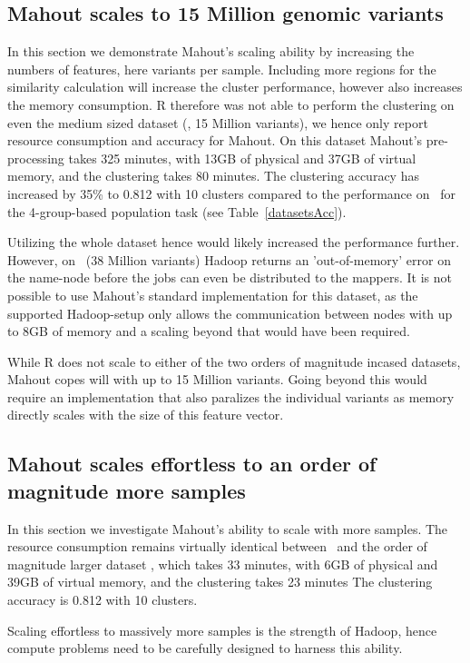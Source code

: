 \documentclass{bioinfo}
\begin{document}
\subsection*{Mahout scales to 15 Million genomic variants}
In this section we demonstrate Mahout's scaling ability by increasing the numbers of features, here variants per sample. 
Including more regions for the similarity calculation will increase the cluster performance, however also increases the memory consumption. 
R therefore was not able to perform the clustering on even the medium sized dataset (\SixReal , 15 Million variants), we hence only report resource consumption and accuracy for Mahout.
On this dataset Mahout's pre-processing takes 325 minutes, with 13GB of physical and 37GB of virtual memory, and the clustering takes 80 minutes.
The clustering accuracy has increased by 35\% to 0.812 with 10 clusters compared to the performance on \OneReal\ for the 4-group-based population task (see Table~\ref{datasetsAcc}).

Utilizing the whole dataset hence would likely increased the performance further. However, on \FullReal\ (38 Million variants) Hadoop returns an 'out-of-memory' error on the name-node before the jobs can even be distributed to the mappers. 
It is not possible to use Mahout's standard implementation for this dataset, as the supported Hadoop-setup only allows the communication between nodes with up to 8GB of memory and a scaling beyond that would have been required.

While R does not scale to either of the two orders of magnitude incased datasets, Mahout copes will with up to 15 Million variants. Going beyond this would require an implementation that also paralizes the individual variants as memory directly scales with the size of this feature vector.  


\subsection*{Mahout scales effortless to an order of magnitude more samples}
In this section we investigate Mahout's ability to scale with more samples.
The resource consumption remains virtually identical between \SixReal\ and the order of magnitude larger dataset \SixArtiExact, which takes 33 minutes, with 6GB of physical and 39GB of virtual memory, and the clustering takes 23 minutes 
The clustering accuracy is 0.812 with 10 clusters.

Scaling effortless to massively more samples is the strength of Hadoop, hence compute problems need to be carefully designed to harness this ability.  
\end{document}
